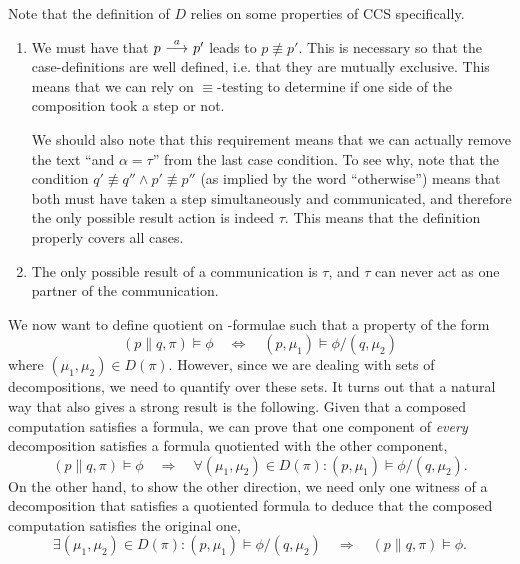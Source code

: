 Note that the definition of $D$ relies on some properties of CCS specifically.
\begin{enumerate}
    \item We must have that $p \ {\stackrel{{a}}{\longrightarrow}}\  p'$ leads to $p\not\equiv p'$. This is
          necessary so that the case-definitions are well defined, i.e. that
          they are mutually exclusive. This means that we can rely on
          $\equiv$-testing to determine if one side of the composition took
          a step or not.

          We should also note that this requirement means that we can actually
          remove the text ``and $\alpha=\tau$'' from the last case condition. To
          see why, note that the condition $q'\not\equiv q'' \land p'\not\equiv p''$
          (as implied by the word ``otherwise'') means that both must have taken
          a step simultaneously and communicated,  and therefore the only possible
          result action is indeed $\tau$. This means that the definition properly
          covers all cases.
    \item The only possible result of a communication is $\tau$, and $\tau$
          can never act as one partner of the communication.
\end{enumerate}

We now want to define quotient on \HMLpast-formulae such that a property of the
form
\[
    (p\parallel q, \pi) \vDash \phi  \quad\Leftrightarrow\quad
    (p, \mu_1) \vDash \phi/(q, \mu_2)
\]
where $(\mu_1,\mu_2) \in D(\pi)$. However, since we are dealing with sets of
decompositions, we need to quantify over these sets. It turns out that a
natural way that also gives a strong result is the following. Given that a composed
computation satisfies a formula, we can prove that one component of {\em every}
decomposition satisfies a formula quotiented with the other component,
\[
    (p\parallel q, \pi) \vDash \phi  \quad\Rightarrow\quad
    \forall (\mu_1,\mu_2) \in D(\pi) : (p, \mu_1) \vDash \phi/(q, \mu_2).
\]
On the other hand, to show the other direction, we need only one witness of a
decomposition that satisfies a quotiented formula to deduce that the composed
computation satisfies the original one,
\[
    \exists (\mu_1,\mu_2) \in D(\pi) : (p, \mu_1) \vDash \phi/(q, \mu_2)
    \quad\Rightarrow\quad
    (p\parallel q, \pi) \vDash \phi.
\]

